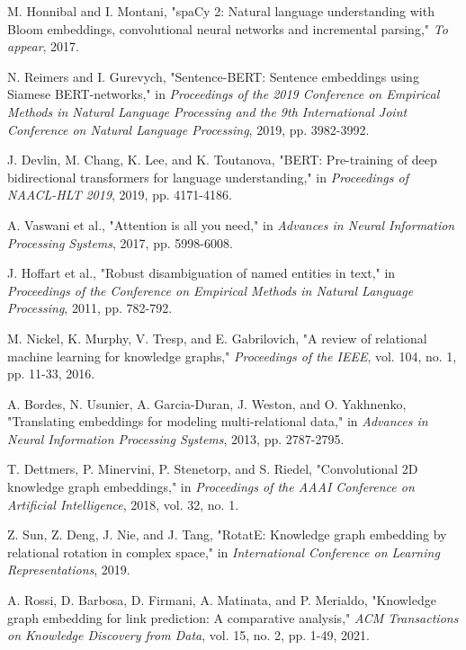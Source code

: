 \documentclass[conference]{IEEEtran}
\begin{document}
\begin{thebibliography}{1}
M. Honnibal and I. Montani, "spaCy 2: Natural language understanding with Bloom embeddings, convolutional neural networks and incremental parsing," \textit{To appear}, 2017.

N. Reimers and I. Gurevych, "Sentence-BERT: Sentence embeddings using Siamese BERT-networks," in \textit{Proceedings of the 2019 Conference on Empirical Methods in Natural Language Processing and the 9th International Joint Conference on Natural Language Processing}, 2019, pp. 3982-3992.

J. Devlin, M. Chang, K. Lee, and K. Toutanova, "BERT: Pre-training of deep bidirectional transformers for language understanding," in \textit{Proceedings of NAACL-HLT 2019}, 2019, pp. 4171-4186.

A. Vaswani et al., "Attention is all you need," in \textit{Advances in Neural Information Processing Systems}, 2017, pp. 5998-6008.

J. Hoffart et al., "Robust disambiguation of named entities in text," in \textit{Proceedings of the Conference on Empirical Methods in Natural Language Processing}, 2011, pp. 782-792.

M. Nickel, K. Murphy, V. Tresp, and E. Gabrilovich, "A review of relational machine learning for knowledge graphs," \textit{Proceedings of the IEEE}, vol. 104, no. 1, pp. 11-33, 2016.

A. Bordes, N. Usunier, A. Garcia-Duran, J. Weston, and O. Yakhnenko, "Translating embeddings for modeling multi-relational data," in \textit{Advances in Neural Information Processing Systems}, 2013, pp. 2787-2795.

T. Dettmers, P. Minervini, P. Stenetorp, and S. Riedel, "Convolutional 2D knowledge graph embeddings," in \textit{Proceedings of the AAAI Conference on Artificial Intelligence}, 2018, vol. 32, no. 1.

Z. Sun, Z. Deng, J. Nie, and J. Tang, "RotatE: Knowledge graph embedding by relational rotation in complex space," in \textit{International Conference on Learning Representations}, 2019.

A. Rossi, D. Barbosa, D. Firmani, A. Matinata, and P. Merialdo, "Knowledge graph embedding for link prediction: A comparative analysis," \textit{ACM Transactions on Knowledge Discovery from Data}, vol. 15, no. 2, pp. 1-49, 2021.
\end{thebibliography}
\end{document}
